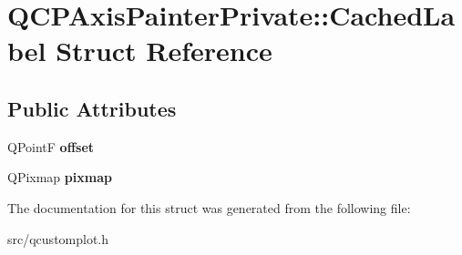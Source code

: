 \hypertarget{structQCPAxisPainterPrivate_1_1CachedLabel}{}\section{Q\+C\+P\+Axis\+Painter\+Private\+:\+:Cached\+Label Struct Reference}
\label{structQCPAxisPainterPrivate_1_1CachedLabel}
\subsection*{Public Attributes}
\begin{DoxyCompactItemize}
\item 
Q\+PointF {\bfseries offset}\hypertarget{structQCPAxisPainterPrivate_1_1CachedLabel_a5f502db71c92e572f1e6f44f62c59d8e}{}\label{structQCPAxisPainterPrivate_1_1CachedLabel_a5f502db71c92e572f1e6f44f62c59d8e}

\item 
Q\+Pixmap {\bfseries pixmap}\hypertarget{structQCPAxisPainterPrivate_1_1CachedLabel_a461597cbd470914a9d24b64d16037a88}{}\label{structQCPAxisPainterPrivate_1_1CachedLabel_a461597cbd470914a9d24b64d16037a88}

\end{DoxyCompactItemize}


The documentation for this struct was generated from the following file\+:\begin{DoxyCompactItemize}
\item 
src/qcustomplot.\+h\end{DoxyCompactItemize}
